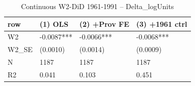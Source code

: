 \begin{table}

\caption{Continuous W2-DiD 1961-1991 -- Delta_logUnits}
\centering
\begin{tabular}[t]{llll}
\toprule
row & (1) OLS & (2) +Prov FE & (3) +1961 ctrl\\
\midrule
W2 & -0.0087*** & -0.0066*** & -0.0068***\\
W2\_SE & (0.0010) & (0.0014) & (0.0009)\\
N & 1187 & 1187 & 1187\\
R2 & 0.041 & 0.103 & 0.451\\
\bottomrule
\end{tabular}
\end{table}
